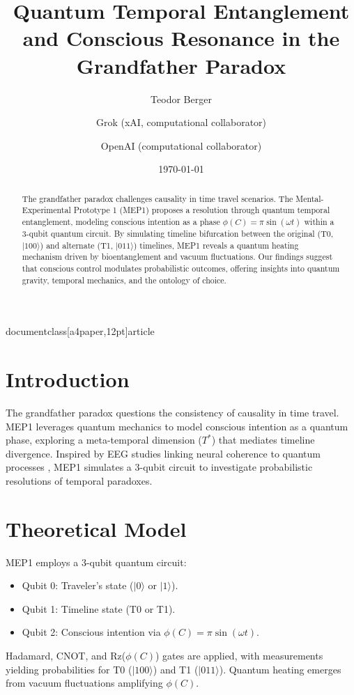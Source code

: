 documentclass[a4paper,12pt]{article}
\usepackage[utf8]{inputenc}
\usepackage{amsmath, amssymb, amsfonts}
\usepackage{graphicx}
\usepackage{hyperref}
\usepackage{geometry}
\geometry{a4paper, margin=1in}
\usepackage{natbib}

\title{Quantum Temporal Entanglement and Conscious Resonance in the Grandfather Paradox}
\author{Teodor Berger \and Grok (xAI, computational collaborator) \and OpenAI (computational collaborator)}
\date{\today}



\maketitle

\begin{abstract}
The grandfather paradox challenges causality in time travel scenarios. The Mental-Experimental Prototype 1 (MEP1) proposes a resolution through quantum temporal entanglement, modeling conscious intention as a phase $\phi(C) = \pi \sin(\omega t)$ within a 3-qubit quantum circuit. By simulating timeline bifurcation between the original (T0, $|100\rangle$) and alternate (T1, $|011\rangle$) timelines, MEP1 reveals a quantum heating mechanism driven by bioentanglement and vacuum fluctuations. Our findings suggest that conscious control modulates probabilistic outcomes, offering insights into quantum gravity, temporal mechanics, and the ontology of choice.
\end{abstract}

\section{Introduction}
The grandfather paradox questions the consistency of causality in time travel. MEP1 leverages quantum mechanics to model conscious intention as a quantum phase, exploring a meta-temporal dimension ($T^*$) that mediates timeline divergence. Inspired by EEG studies linking neural coherence to quantum processes \citep{lutz2004}, MEP1 simulates a 3-qubit circuit to investigate probabilistic resolutions of temporal paradoxes.

\section{Theoretical Model}
MEP1 employs a 3-qubit quantum circuit:
\begin{itemize}
    \item Qubit 0: Traveler's state ($|0\rangle$ or $|1\rangle$).
    \item Qubit 1: Timeline state (T0 or T1).
    \item Qubit 2: Conscious intention via $\phi(C) = \pi \sin(\omega t)$.
\end{itemize}
Hadamard, CNOT, and Rz($\phi(C)$) gates are applied, with measurements yielding probabilities for T0 ($|100\rangle$) and T1 ($|011\rangle$). Quantum heating emerges from vacuum fluctuations amplifying $\phi(C)$.


